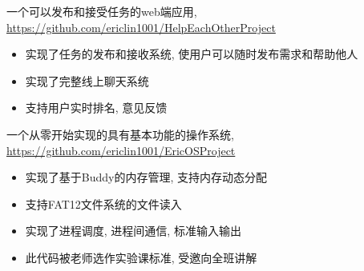 \documentclass{resume}
\begin{document}

一个可以发布和接受任务的web端应用, \url{https://github.com/ericlin1001/HelpEachOtherProject}
\begin{itemize}
	\item 实现了任务的发布和接收系统, 使用户可以随时发布需求和帮助他人	

	\item 实现了完整线上聊天系统
	\item 支持用户实时排名, 意见反馈
\end{itemize}

一个从零开始实现的具有基本功能的操作系统, \url{https://github.com/ericlin1001/EricOSProject}
\begin{itemize}
	\item 实现了基于Buddy的内存管理, 支持内存动态分配 
	\item 支持FAT12文件系统的文件读入
	\item 实现了进程调度, 进程间通信, 标准输入输出
	\item 此代码被老师选作实验课标准, 受邀向全班讲解 
\end{itemize}
\end{document}
